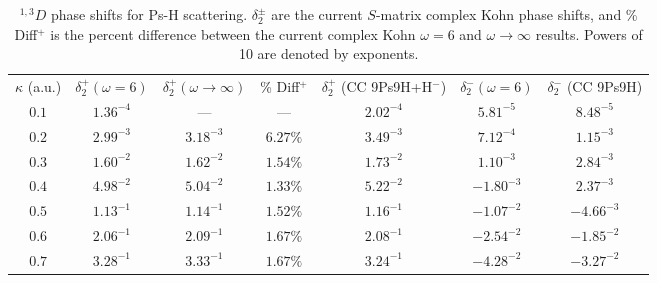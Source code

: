 \documentclass[preprint,showpacs,showkeys,preprintnumbers,amsmath,amssymb,longbibliography,pra,aps]{revtex4-1}
\begin{document}
\begin{table}
\begin{center}
\begin{ruledtabular}
\begin{tabular}{c | c c c c | c c}
$\kappa$ (a.u.) & $\delta_2^+ (\omega = 6)$ & $\delta_2^+ (\omega \rightarrow \infty)$ & \% Diff$^+$ & $\delta_2^+$ (CC 9Ps9H+H$^-$) \cite{Walters2004} & $\delta_2^- (\omega = 6)$ & $\delta_2^-$ (CC 9Ps9H) \cite{Blackwood2002} \\
\colrule
$0.1$ & $1.36^{-4}$ & --- & --- & $2.02^{-4}$ & $5.81^{-5}$ & $8.48^{-5}$ \\
$0.2$ & $2.99^{-3}$ & $3.18^{-3}$ & $6.27\%$ & $3.49^{-3}$ & $7.12^{-4}$ & $1.15^{-3}$ \\
$0.3$ & $1.60^{-2}$ & $1.62^{-2}$ & $1.54\%$ & $1.73^{-2}$ & $1.10^{-3}$ & $2.84^{-3}$ \\
$0.4$ & $4.98^{-2}$ & $5.04^{-2}$ & $1.33\%$ & $5.22^{-2}$ & $-1.80^{-3}$ & $2.37^{-3}$ \\
$0.5$ & $1.13^{-1}$ & $1.14^{-1}$ & $1.52\%$ & $1.16^{-1}$ & $-1.07^{-2}$ & $-4.66^{-3}$ \\
$0.6$ & $2.06^{-1}$ & $2.09^{-1}$ & $1.67\%$ & $2.08^{-1}$ & $-2.54^{-2}$ & $-1.85^{-2}$ \\
$0.7$ & $3.28^{-1}$ & $3.33^{-1}$ & $1.67\%$ & $3.24^{-1}$ & $-4.28^{-2}$ & $-3.27^{-2}$ \\
\end{tabular}
\end{ruledtabular}
\caption{$^{1,3}D$ phase shifts for Ps-H scattering. $\delta_2^\pm$ are the current
$S$-matrix complex Kohn phase shifts, and \% Diff$^+$ is the percent difference
between the current complex Kohn $\omega = 6$ and $\omega \rightarrow \infty$
results. Powers of 10 are denoted by exponents.}
\label{tab:DWavePhase}
\end{center}
\end{table}
\end{document}
